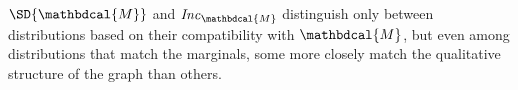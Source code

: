 \documentclass[letterpaper]{article} %
\theoremstyle{plain}
\theoremstyle{definition}
\theoremstyle{remark}
\newcommand{\commentout}[1]{\ignorespaces}
\newcommand{\V}{\mathcal V}
\newcommand{\dg}[1]{\mathbdcal{#1}}
\newcommand\Inc{\mathit{Inc}}
\newcommand{\ed}[3]{#2
  \overset{\smash{\mskip-5mu\raisebox{-1pt}{$\scriptscriptstyle
        #1$}}}{\rightarrow} #3}
\begin{document}
$\SD{\dg M}$ and $\Inc_{\dg M}$ distinguish only
between distributions based on their compatibility with
$\dg M$, but even among distributions that match the
marginals, some more closely match the qualitative structure
of the graph than others.  
\commentout{
Suppose an agent has a PDG $\dg M$ in mind, and imagines that all sample
variation in a joint distribution $\mu$ over $\V(\dg M)$ arises as a result
of sampling the value of a target variable $Y$ of some edge $\ed LXY$, given the
value of $X$. If this is the case, one would expect the total amount of
information required to communicate a sample of $\mu$ to be the same as the
total amount of the information required to separately encode, for
each edge $\ed LXY$, the randomness of $Y$ given $X$.

}
\end{document}
